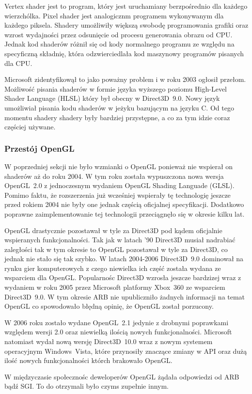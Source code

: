 Vertex shader jest to program, który jest uruchamiany berzpośrednio dla każdego wierzchólka. Pixel shader jest analogicznm programem wykonywanym dla każdego piksela. Shadery umożliwiły większą swobodę programowania grafiki oraz wzrost wydajności przez odsunięcie od procesu generowania obrazu od CPU. Jednak kod shaderów różnił się od kody normalnego programu ze względu na specyficzną składnię, która odzwierciedlała kod maszynowy programów pisanych dla CPU.

Microsoft zidentyfikowął to jako poważny problem i w roku 2003 ogłosił przełom. Możliwość pisania shaderów w formie języka wyższego poziomu High-Level Shader Language (HLSL) który był obecny w Direct3D~9.0. Nowy język umożliwiał pisania kodu shaderów w jeżyku bazującym na języku C. Od tego momentu shadery shadery były bardziej przystępne, a co za tym idzie coraz częściej używane.

\subsubsection{Przestój OpenGL}
\thispagestyle{empty}
\par\indent

W poprzedniej sekcji nie było wzmianki o OpenGL ponieważ nie wspierał on shaderów aż do roku 2004. W tym roku została wypuszczona nowa wersja OpenGL~2.0 z jednoczesnym wydaniem OpenGL Shading Languade (GLSL). Pomimo faktu, że rozszerzenia już wcześniej wspierały tę technologię jeszcze przed rokiem 2004 nie były one jednak częścią oficjalnej specyfikacji. Dodatkowo poprawne zaimplementowanie tej technologii przeciągnęło się w okresie kilku lat.

OpenGL drastycznie pozostawał w tyle za Direct3D pod kądem oficjalnie wspieranych funkcjonalności. Tak jak w latach '90 Direct3D musiał nadrabiać zaległości tak w tym okresie to OpenGL pozostawał w tyle za Direct3D, co jednak nie stało się tak szybko. W latach 2004-2006 Direct3D~9.0 dominował na rynku gier komputerowych z czego niewielka ich część została wydana ze wsparciem dla OpenGL. Popularnośc Direct3D wzrosła jeszcze bardzizej wraz z wydaniem w roku 2005 przez Microsoft platformy Xbox~360 ze wsparciem Direct3D~9.0. W tym okresie ARB nie upubliczniło żadnych informacji na temat OpenGL co spowodowało błędną opinię, że OpenGL został porzucony.

W 2006 roku zostało wydane OpenGL~2.1 jedynie z drobnymi poprawkami względem wersji 2.0 oraz niewielką ilością nowych funkcjonalności. Microsoft natomiast wydał nową wersję Direct3D~10.0 wraz z nowym systemem operacyjnym Windows~Vista, które przynosiły znaczące zmiany w API oraz dużą ilość nowych funkcjonalności którch brakowało OpenGL.

W międzyczasie społecznośc deweloperów OpenGL żądała odpowiedzi od ARB bądź SGI. To do otrzymali było czyms zupełnie innym.